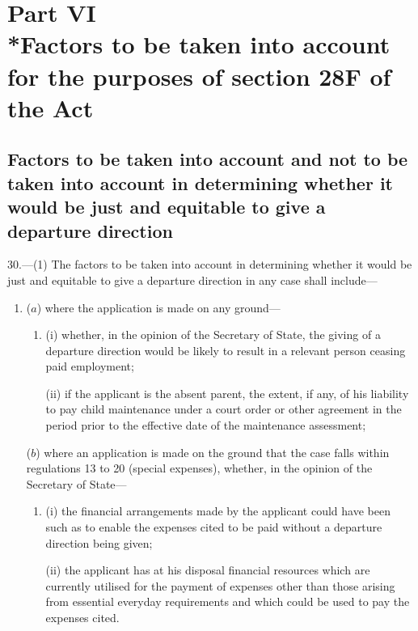 \documentclass[a4paper]{article}
\newcommand{\parthead}{}
\begin{document}
\section[Part VI --- Factors to be taken into account for the purposes of section 28F of the Act]{Part VI\\*Factors to be taken into account for the purposes of section 28F of the Act}

\subsection[30. Factors to be taken into account and not to be taken into account in determining whether it would be just and equitable to give a departure direction]{Factors to be taken into account and not to be taken into account in determining whether it would be just and equitable to give a departure direction}

\renewcommand\parthead{--- Part VI}

30.—(1) The factors to be taken into account in determining whether it would be just and equitable to give a departure direction in any case shall include—
\begin{enumerate}\item[]
($a$) where the application is made on any ground—
\begin{enumerate}\item[]
(i) whether, in the opinion of the Secretary of State, the giving of a departure direction would be likely to result in a relevant person ceasing paid employment;

(ii) if the applicant is the absent parent, the extent, if any, of his liability to pay child maintenance under a court order or other agreement in the period prior to the effective date of the maintenance assessment;
\end{enumerate}

($b$) where an application is made on the ground that the case falls within regulations 13 to 20 (special expenses), whether, in the opinion of the Secretary of State—
\begin{enumerate}\item[]
(i) the financial arrangements made by the applicant could have been such as to enable the expenses cited to be paid without a departure direction being given;

(ii) the applicant has at his disposal financial resources which are currently utilised for 
the payment of expenses other than those arising from essential everyday requirements and which could be used to pay the expenses cited.
\end{enumerate}
\end{enumerate}
\end{document}
